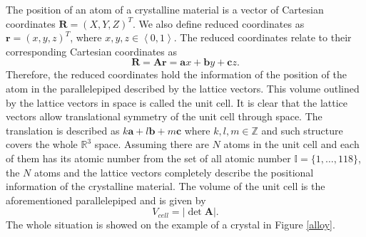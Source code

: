 \documentclass[11pt,oneside,czech,american]{book} %
\theoremstyle{plain}
\theoremstyle{definition}
\begin{document}
The position of an atom of a crystalline material is a vector of Cartesian coordinates $\boldsymbol{R} = (X, Y, Z)^T$. We also define reduced coordinates as $\boldsymbol{r} = (x, y, z)^T$, where $x,y,z \in \left<0, 1\right>$. The reduced coordinates relate to their corresponding Cartesian coordinates as
\begin{equation}
	\boldsymbol{R} = \bm{A} \boldsymbol{r} = \boldsymbol{a} x + \boldsymbol{b} y + \boldsymbol{c} z.
\end{equation}
Therefore, the reduced coordinates hold the information of the position of the atom in the parallelepiped described by the lattice vectors. This volume outlined by the lattice vectors in space is called the unit cell. It is clear that the lattice vectors allow translational symmetry of the unit cell through space. The translation is described as $k \boldsymbol{a} + l \boldsymbol{b} + m \boldsymbol{c}$ where $k,l,m \in \mathbb{Z}$ and such structure covers the whole $\mathbb{R}^3$ space. Assuming there are $N$ atoms in the unit cell and each of them has its atomic number from the set of all atomic number $\mathbb{I} = \{1, \dots, 118\}$, the $N$ atoms and the lattice vectors completely describe the positional information of the crystalline material. The volume of the unit cell is the aforementioned parallelepiped and is given by
\begin{equation}
	V_{cell} = |\det \bm{A}|.
\end{equation}
The whole situation is showed on the example of a crystal in Figure \ref{alloy}.
\end{document}
